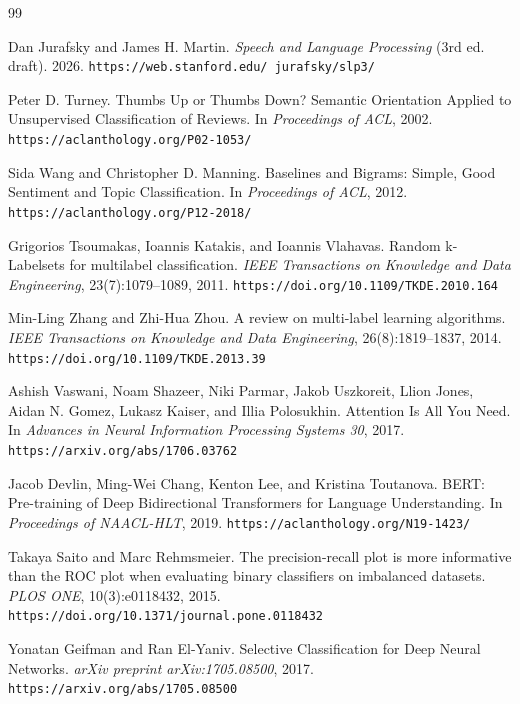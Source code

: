﻿\documentclass[12pt,a4paper]{article}
\begin{document}
\begin{thebibliography}{99}

Dan Jurafsky and James H. Martin.
\textit{Speech and Language Processing} (3rd ed. draft).
2026.
\newline\texttt{https://web.stanford.edu/~jurafsky/slp3/}

Peter D. Turney.
Thumbs Up or Thumbs Down? Semantic Orientation Applied to Unsupervised Classification of Reviews.
In \textit{Proceedings of ACL}, 2002.
\newline\texttt{https://aclanthology.org/P02-1053/}

Sida Wang and Christopher D. Manning.
Baselines and Bigrams: Simple, Good Sentiment and Topic Classification.
In \textit{Proceedings of ACL}, 2012.
\newline\texttt{https://aclanthology.org/P12-2018/}

Grigorios Tsoumakas, Ioannis Katakis, and Ioannis Vlahavas.
Random k-Labelsets for multilabel classification.
\textit{IEEE Transactions on Knowledge and Data Engineering}, 23(7):1079--1089, 2011.
\newline\texttt{https://doi.org/10.1109/TKDE.2010.164}

Min-Ling Zhang and Zhi-Hua Zhou.
A review on multi-label learning algorithms.
\textit{IEEE Transactions on Knowledge and Data Engineering}, 26(8):1819--1837, 2014.
\newline\texttt{https://doi.org/10.1109/TKDE.2013.39}

Ashish Vaswani, Noam Shazeer, Niki Parmar, Jakob Uszkoreit, Llion Jones, Aidan N. Gomez, Lukasz Kaiser, and Illia Polosukhin.
Attention Is All You Need.
In \textit{Advances in Neural Information Processing Systems 30}, 2017.
\newline\texttt{https://arxiv.org/abs/1706.03762}

Jacob Devlin, Ming-Wei Chang, Kenton Lee, and Kristina Toutanova.
BERT: Pre-training of Deep Bidirectional Transformers for Language Understanding.
In \textit{Proceedings of NAACL-HLT}, 2019.
\newline\texttt{https://aclanthology.org/N19-1423/}

Takaya Saito and Marc Rehmsmeier.
The precision-recall plot is more informative than the ROC plot when evaluating binary classifiers on imbalanced datasets.
\textit{PLOS ONE}, 10(3):e0118432, 2015.
\newline\texttt{https://doi.org/10.1371/journal.pone.0118432}

Yonatan Geifman and Ran El-Yaniv.
Selective Classification for Deep Neural Networks.
\textit{arXiv preprint arXiv:1705.08500}, 2017.
\newline\texttt{https://arxiv.org/abs/1705.08500}

\end{thebibliography}
\end{document}

